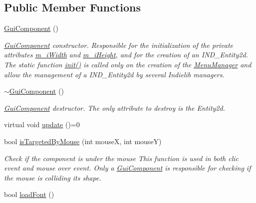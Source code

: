 \subsection*{Public Member Functions}
\begin{DoxyCompactItemize}
\item 
\hyperlink{class_symp_1_1_gui_component_a22124675c2976983ac18374f81cc3fb3}{Gui\-Component} ()
\begin{DoxyCompactList}\small\item\em \hyperlink{class_symp_1_1_gui_component}{Gui\-Component} constructor. Responsible for the initialization of the private attributes \hyperlink{class_symp_1_1_gui_component_ad4c3e34b824e1f9d6a030ca54fc1a7cf}{m\-\_\-i\-Width} and \hyperlink{class_symp_1_1_gui_component_aa84bb60b7aa1adb1522c63acff2909c2}{m\-\_\-i\-Height}, and for the creation of an I\-N\-D\-\_\-\-Entity2d. The static function \hyperlink{class_symp_1_1_gui_component_a05838e01bbf1e31f292ed4b92a520f20}{init()} is called only on the creation of the \hyperlink{class_symp_1_1_menu_manager}{Menu\-Manager} and allow the management of a I\-N\-D\-\_\-\-Entity2d by several Indielib managers. \end{DoxyCompactList}\item 
\hyperlink{class_symp_1_1_gui_component_ac05c461540b767c3670996a9f67ba0ba}{$\sim$\-Gui\-Component} ()
\begin{DoxyCompactList}\small\item\em \hyperlink{class_symp_1_1_gui_component}{Gui\-Component} destructor. The only attribute to destroy is the Entity2d. \end{DoxyCompactList}\item 
virtual void \hyperlink{class_symp_1_1_gui_component_add73e07ea0a3c9c1c90640e783a3b5de}{update} ()=0
\item 
bool \hyperlink{class_symp_1_1_gui_component_ab3c318bd857cbefa99c0d4848e8d5cc8}{is\-Targeted\-By\-Mouse} (int mouse\-X, int mouse\-Y)
\begin{DoxyCompactList}\small\item\em Check if the component is under the mouse This function is used in both clic event and mouse over event. Only a \hyperlink{class_symp_1_1_gui_component_a22124675c2976983ac18374f81cc3fb3}{Gui\-Component} is responsible for checking if the mouse is colliding its shape. \end{DoxyCompactList}\item 
bool \hyperlink{class_symp_1_1_gui_component_a1f8ff56c174ae9f4c32b31a0ed1a53b9}{load\-Font} ()

\end{DoxyCompactItemize}
